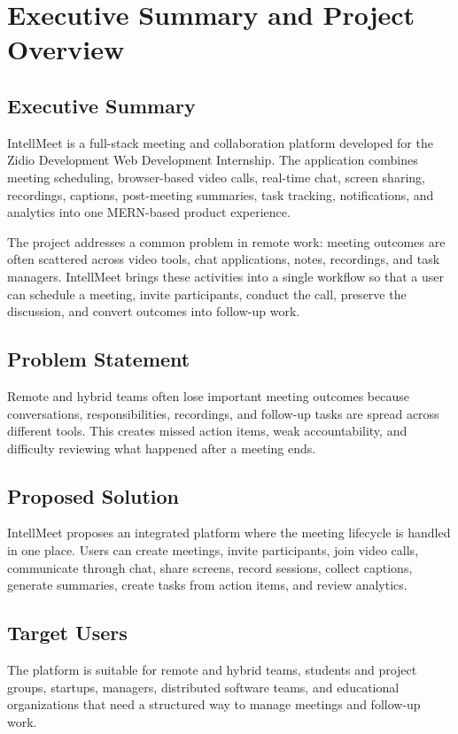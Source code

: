 \documentclass[11pt,a4paper]{article}
\begin{document}
\tableofcontents
\vspace{0.4cm}

\section{Executive Summary and Project Overview}
\subsection{Executive Summary}
IntellMeet is a full-stack meeting and collaboration platform developed for the Zidio Development Web Development Internship. The application combines meeting scheduling, browser-based video calls, real-time chat, screen sharing, recordings, captions, post-meeting summaries, task tracking, notifications, and analytics into one MERN-based product experience.

The project addresses a common problem in remote work: meeting outcomes are often scattered across video tools, chat applications, notes, recordings, and task managers. IntellMeet brings these activities into a single workflow so that a user can schedule a meeting, invite participants, conduct the call, preserve the discussion, and convert outcomes into follow-up work.

\subsection{Problem Statement}
Remote and hybrid teams often lose important meeting outcomes because conversations, responsibilities, recordings, and follow-up tasks are spread across different tools. This creates missed action items, weak accountability, and difficulty reviewing what happened after a meeting ends.

\subsection{Proposed Solution}
IntellMeet proposes an integrated platform where the meeting lifecycle is handled in one place. Users can create meetings, invite participants, join video calls, communicate through chat, share screens, record sessions, collect captions, generate summaries, create tasks from action items, and review analytics.

\subsection{Target Users}
The platform is suitable for remote and hybrid teams, students and project groups, startups, managers, distributed software teams, and educational organizations that need a structured way to manage meetings and follow-up work.
\end{document}
